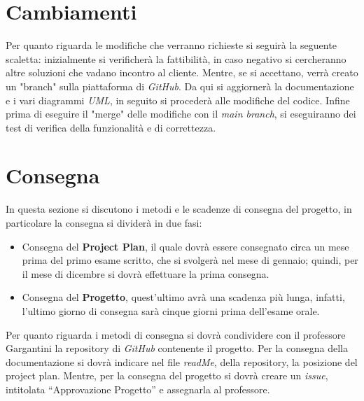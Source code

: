 \documentclass[12pt, letterpaper]{book}
\begin{document}
\section{Cambiamenti}

    Per quanto riguarda le modifiche che verranno richieste si seguirà la seguente scaletta: inizialmente si verificherà la fattibilità, in caso negativo si cercheranno altre soluzioni che vadano incontro al cliente. Mentre, se si accettano, verrà creato un "branch" sulla piattaforma di \textit{GitHub}. Da qui si aggiornerà la documentazione e i vari diagrammi \textit{UML}, in seguito si procederà alle modifiche del codice. Infine prima di eseguire il "merge" delle modifiche con il \textit{main branch}, si eseguiranno dei test di verifica della funzionalità e di correttezza.

\section{Consegna}


    In questa sezione si discutono i metodi e le scadenze di consegna del progetto, in particolare la consegna si dividerà in due fasi:


    \begin{itemize}
        \item Consegna del \textbf{Project Plan}, il quale dovrà essere consegnato circa un mese prima del primo esame scritto, che si svolgerà nel mese di gennaio; quindi, per il mese di dicembre si dovrà effettuare la prima consegna.
        \item Consegna del \textbf{Progetto}, quest'ultimo avrà una scadenza più lunga, infatti, l'ultimo giorno di consegna sarà cinque giorni prima dell'esame orale.
    \end{itemize}
    Per quanto riguarda i metodi di consegna si dovrà condividere con il professore Gargantini la repository di \textit{GitHub} contenente il progetto. Per la consegna della documentazione si dovrà indicare nel file \textit{readMe}, della repository, la posizione del project plan. Mentre, per la consegna del progetto si dovrà creare un \textit{issue}, intitolata “Approvazione Progetto” e assegnarla al professore.


\end{document}

